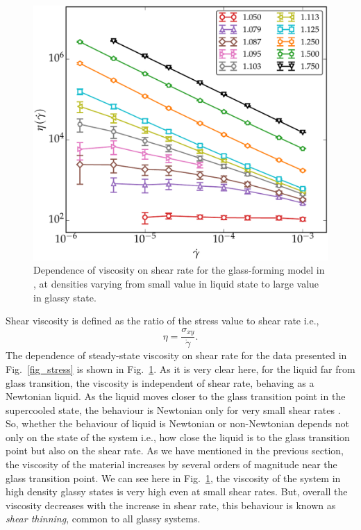      \begin{figure}[hbt!]
	\includegraphics[width=14cm]{figs/fig_viscosity.pdf}
	\centering
	\caption[{\em Dependence of viscosity on shear rate}]{Dependence of viscosity on shear rate for the glass-forming model in \cite{vaibhav2022finite,vaibhav2020response}, at densities varying from small value in liquid state to large value in glassy state.\label{fig_viscosity}}
    \end{figure}
    
    Shear viscosity is defined as the ratio of the stress value to shear rate i.e.,
    \begin{equation}
        \eta = \frac{\sigma_{xy}}{\dot{\gamma}}.
    \end{equation}
    The dependence of steady-state viscosity on shear rate for the data presented in Fig.~\ref{fig_stress} is shown in Fig.~\ref{fig_viscosity}. As it is very clear here, for the liquid far from glass transition, the viscosity is independent of shear rate, behaving as a Newtonian liquid. As the liquid moves closer to the glass transition point in the supercooled state, the behaviour is Newtonian only for very small shear rates \cite{golkia2020}. So, whether the behaviour of liquid is Newtonian or non-Newtonian depends not only on the state of the system i.e., how close the liquid is to the glass transition point but also on the shear rate. As we have mentioned in the previous section, the viscosity of the material increases by several orders of magnitude near the glass transition point. We can see here in Fig.~\ref{fig_viscosity}, the viscosity of the system in high density glassy states is very high even at small shear rates. But, overall the viscosity decreases with the increase in shear rate, this behaviour is known as {\em shear thinning}, common to all glassy systems.
    
